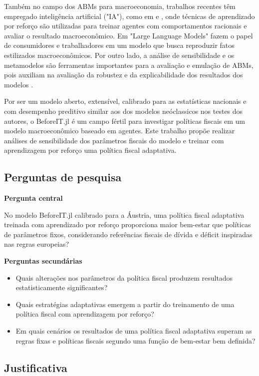 \documentclass[12pt,a4paper]{article}
\let\cite\citep
\begin{document}
Também no campo dos ABMs para macroeconomia, trabalhos recentes têm empregado inteligência artificial ("IA"), como em \citet{zheng2022} e \citet{brusatin2024}, onde técnicas de aprendizado por reforço são utilizadas para treinar agentes com comportamentos racionais e avaliar o resultado macroeconômico. Em \citet{li2024} "Large Language Models" fazem o papel de consumidores e trabalhadores em um modelo que busca reproduzir fatos estilizados macroeconômicos. Por outro lado, a análise de sensibilidade e os metamodelos são ferramentas importantes para a avaliação e emulação de ABMs, pois auxiliam na avaliação da robustez e da explicabilidade dos resultados dos modelos \cite{angione2022}.

Por ser um modelo aberto, extensível, calibrado para as estatísticas nacionais e com desempenho preditivo similar aos dos modelos neóclassicos nos testes dos autores, o BeforeIT.jl é um campo fértil para investigar políticas fiscais em um modelo macroeconômico baseado em agentes. Este trabalho propõe realizar análises de sensibilidade dos parâmetros fiscais do modelo e treinar com aprendizagem por reforço uma política fiscal adaptativa.

\subsection{Perguntas de pesquisa}

\textbf{Pergunta central}

No modelo BeforeIT.jl calibrado para a Áustria, uma política fiscal adaptativa treinada com aprendizado por reforço proporciona maior bem-estar que políticas de parâmetros fixos, considerando referências fiscais de dívida e déficit inspiradas nas regras europeias?

\textbf{Perguntas secundárias}
\begin{itemize}
    \item Quais alterações nos parâmetros da política fiscal produzem resultados estatisticamente significantes?
    \item Quais estratégias adaptativas emergem a partir do treinamento de uma política fiscal com aprendizagem por reforço?
    \item Em quais cenários os resultados de uma política fiscal adaptativa superam as regras fixas e políticas fiscais segundo uma função de bem-estar bem definida?
\end{itemize}

\subsection{Justificativa}
\end{document}
